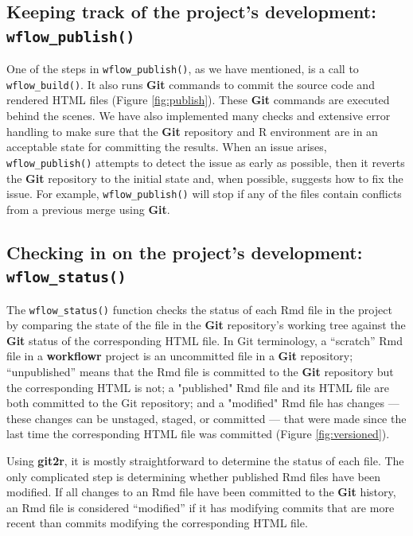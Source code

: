 \documentclass[9pt,a4paper]{extarticle}
\begin{document}
\subsection*{Keeping track of the project's development: \texttt{wflow\_publish()}}

One of the steps in \texttt{wflow\_publish()}, as we have mentioned, is a call to
\texttt{wflow\_build()}. It also runs \textbf{Git} commands to commit the source code and
rendered HTML files (Figure \ref{fig:publish}). These \textbf{Git} commands are executed behind
the scenes. We have also implemented many checks and extensive error
handling to make sure that the \textbf{Git} repository and R environment are in
an acceptable state for committing the results. When an issue arises,
\texttt{wflow\_publish()} attempts to detect the issue as early as possible, then
it reverts the \textbf{Git} repository to the initial state and, when possible,
suggests how to fix the issue. For example, \texttt{wflow\_publish()} will stop if
any of the files contain conflicts from a previous merge using \textbf{Git}.

\subsection*{Checking in on the project's development: \texttt{wflow\_status()}}

The \texttt{wflow\_status()} function checks the status of each Rmd file in the
project by comparing the state of the file in the \textbf{Git} repository's
working tree against the \textbf{Git} status of the corresponding HTML file. In
Git terminology, a “scratch” Rmd file in a \textbf{workflowr} project is an
uncommitted file in a \textbf{Git} repository; “unpublished” means that the Rmd
file is committed to the \textbf{Git} repository but the corresponding HTML is
not; a "published" Rmd file and its HTML file are both committed to the
Git repository; and a "modified" Rmd file has changes --- these changes
can be unstaged, staged, or committed --- that were made since the last
time the corresponding HTML file was committed (Figure \ref{fig:versioned}).

Using \textbf{git2r}, it is mostly straightforward to determine the status of
each file. The only complicated step is determining whether published
Rmd files have been modified. If all changes to an Rmd file have been
committed to the \textbf{Git} history, an Rmd file is considered “modified” if it
has modifying commits that are more recent than commits modifying the
corresponding HTML file.
\end{document}
